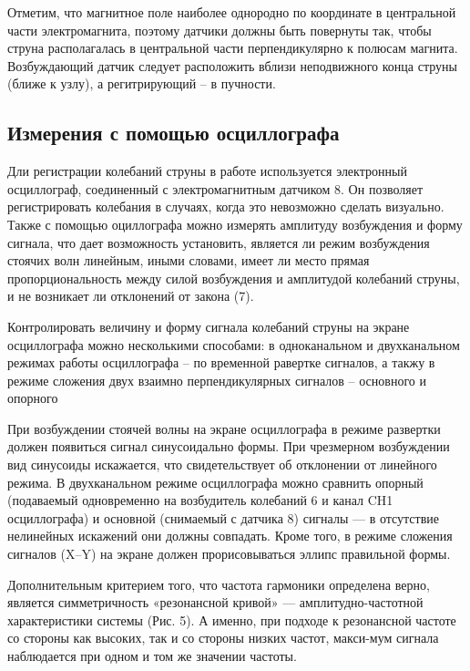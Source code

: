 \documentclass[a4paper,12pt]{article} %
\begin{document}
Отметим, что магнитное поле наиболее однородно по координате в центральной части электромагнита, поэтому датчики должны быть повернуты так, чтобы струна располагалась в центральной части перпендикулярно к полюсам магнита. Возбуждающий датчик следует расположить вблизи неподвижного конца струны (ближе к узлу), а регитрирующий -- в пучности.
\subsection{Измерения с помощью осциллографа}
Дли регистрации колебаний струны в работе используется электронный осциллограф, соединенный с электромагнитным датчиком 8. Он позволяет регистрировать колебания в случаях, когда это невозможно сделать визуально. Также с помощью оциллографа можно измерять амплитуду возбуждения и форму сигнала, что дает возможность установить, является ли режим возбуждения стоячих волн линейным, иными словами, имеет ли место прямая пропорциональность между силой возбуждения и амплитудой колебаний струны, и не возникает ли отклонений от закона (7).

 Контролировать величину и форму сигнала колебаний струны на экране осциллографа можно несколькими способами: в одноканальном и двухканальном режимах работы осциллографа -- по временной равертке сигналов, а такжу в режиме сложения двух взаимно перпендикулярных сигналов -- основного и опорного


При возбуждении стоячей волны на экране осциллографа в режиме развертки должен появиться сигнал синусоидально формы. При чрезмерном возбуждении вид синусоиды искажается, что свидетельствует об отклонении от линейного режима. В двухканальном режиме осциллографа можно сравнить опорный (подаваемый одновременно на возбудитель колебаний 6 и канал CH1 осциллографа) и основной (снимаемый с датчика 8) сигналы — в отсутствие нелинейных искажений они должны совпадать. Кроме того, в режиме сложения сигналов (X–Y) на экране должен прорисовываться эллипс правильной формы.

Дополнительным критерием того, что частота гармоники определена верно, является симметричность «резонансной кривой» — амплитудно-частотной характеристики системы (Рис. 5). А именно, при подходе к резонансной частоте со стороны как высоких, так и со стороны низких частот, макси-мум сигнала наблюдается при одном и том же значении частоты.
\end{document}
